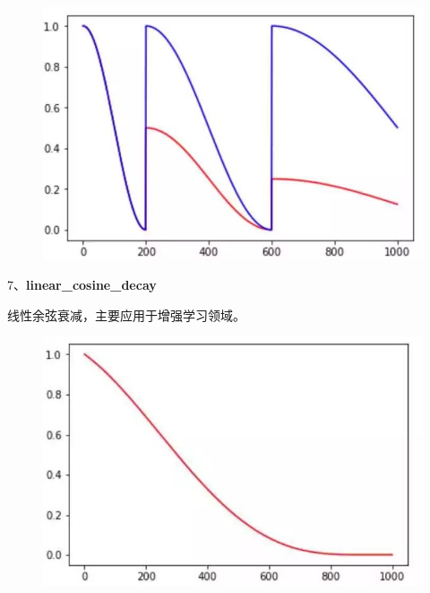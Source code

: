 \begin{figure}
\centering
\includegraphics{./img/ch14/余弦cycle衰减.jpeg}
\caption{}
\end{figure}

7、\textbf{linear\_cosine\_decay}

\begin{Shaded}
\begin{Highlighting}[]
\OperatorTok{=}\OperatorTok{=}\OperatorTok{=}\NormalTok{,}
\OperatorTok{=}\NormalTok{)}
\end{Highlighting}
\end{Shaded}

线性余弦衰减，主要应用于增强学习领域。

\begin{figure}
\centering
\includegraphics{./img/ch14/线性余弦衰减.jpeg}
\caption{}
\end{figure}

